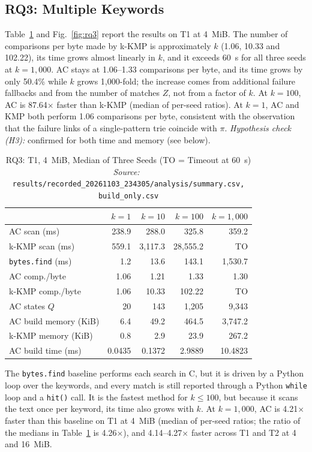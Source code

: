 \documentclass[conference]{IEEEtran}
\newcommand{\src}[1]{{\normalfont\footnotesize\emph{Source:}~\cite{data} {\scriptsize\texttt{#1}}}}
\newcommand{\RM}{results/recorded\_20261103\_234305}
\begin{document}
\subsection{RQ3: Multiple Keywords}
Table~\ref{tab:rq3} and Fig.~\ref{fig:rq3} report the results on T1 at 4~MiB. The number of comparisons per byte made by k-KMP is approximately $k$ (1.06, 10.33 and 102.22), its time grows almost linearly in $k$, and it exceeds 60~s for all three seeds at $k=1{,}000$. AC stays at 1.06--1.33 comparisons per byte, and its time grows by only 50.4\% while $k$ grows 1{,}000-fold; the increase comes from additional failure fallbacks and from the number of matches $Z$, not from a factor of $k$. At $k=100$, AC is 87.64$\times$ faster than k-KMP (median of per-seed ratios). At $k=1$, AC and KMP both perform 1.06 comparisons per byte, consistent with the observation that the failure links of a single-pattern trie coincide with $\pi$. \emph{Hypothesis check (H3):} confirmed for both time and memory (see below).

\begin{table}[t]
\caption{RQ3: T1, 4~MiB, Median of Three Seeds (TO = Timeout at 60~s)\\ \src{\RM/analysis/summary.csv, build\_only.csv}}
\label{tab:rq3}
\centering
\setlength{\tabcolsep}{3.5pt}
\begin{tabular}{@{}lrrrr@{}}
\toprule
& $k=1$ & $k=10$ & $k=100$ & $k=1{,}000$ \\
\midrule
AC scan (ms) & 238.9 & 288.0 & 325.8 & 359.2 \\
k-KMP scan (ms) & 559.1 & 3{,}117.3 & 28{,}555.2 & TO \\
\texttt{bytes.find} (ms) & 1.2 & 13.6 & 143.1 & 1{,}530.7 \\
\midrule
AC comp./byte & 1.06 & 1.21 & 1.33 & 1.30 \\
k-KMP comp./byte & 1.06 & 10.33 & 102.22 & TO \\
\midrule
AC states $Q$ & 20 & 143 & 1{,}205 & 9{,}343 \\
AC build memory (KiB) & 6.4 & 49.2 & 464.5 & 3{,}747.2 \\
k-KMP memory (KiB) & 0.8 & 2.9 & 23.9 & 267.2 \\
AC build time (ms) & 0.0435 & 0.1372 & 2.9889 & 10.4823 \\
\bottomrule
\end{tabular}
\end{table}

The \texttt{bytes.find} baseline performs each search in C, but it is driven by a Python loop over the keywords, and every match is still reported through a Python \texttt{while} loop and a \texttt{hit()} call. It is the fastest method for $k\le 100$, but because it scans the text once per keyword, its time also grows with $k$. At $k=1{,}000$, AC is 4.21$\times$ faster than this baseline on T1 at 4~MiB (median of per-seed ratios; the ratio of the medians in Table~\ref{tab:rq3} is 4.26$\times$), and 4.14--4.27$\times$ faster across T1 and T2 at 4 and 16~MiB.
\end{document}
